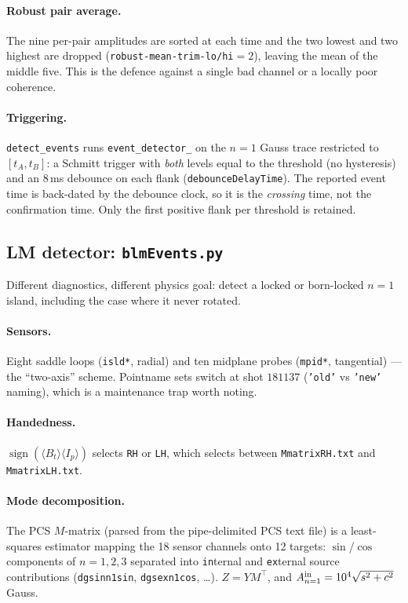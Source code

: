 \documentclass[11pt,a4paper]{article}
\newcommand{\code}[1]{\texttt{\small #1}}
\begin{document}
\paragraph{Robust pair average.} The nine per-pair amplitudes are sorted at each time and the two
lowest and two highest are dropped (\code{robust-mean-trim-lo/hi}$=2$), leaving the mean of the
middle five. This is the defence against a single bad channel or a locally poor coherence.

\paragraph{Triggering.} \code{detect\_events} runs \code{event\_detector\_} on the $n=1$ Gauss trace
restricted to $[t_A,t_B]$: a Schmitt trigger with \emph{both} levels equal to the threshold (no
hysteresis) and an $8$\,ms debounce on each flank (\code{debounceDelayTime}). The reported event
time is back-dated by the debounce clock, so it is the \emph{crossing} time, not the confirmation
time. Only the first positive flank per threshold is retained.

\subsection{LM detector: \code{blmEvents.py}}

Different diagnostics, different physics goal: detect a locked or born-locked $n=1$ island, including
the case where it never rotated.

\paragraph{Sensors.} Eight saddle loops (\code{isld*}, radial) and ten midplane probes
(\code{mpid*}, tangential) --- the ``two-axis'' scheme. Pointname sets switch at shot $181137$
(\code{'old'} vs \code{'new'} naming), which is a maintenance trap worth noting.

\paragraph{Handedness.} $\operatorname{sign}(\langle B_t\rangle\langle I_p\rangle)$ selects
\code{RH} or \code{LH}, which selects between \code{MmatrixRH.txt} and \code{MmatrixLH.txt}.

\paragraph{Mode decomposition.} The PCS $M$-matrix (parsed from the pipe-delimited PCS text file)
is a least-squares estimator mapping the 18 sensor channels onto 12 targets: $\sin$/$\cos$
components of $n=1,2,3$ separated into \code{in}ternal and \code{ex}ternal source contributions
(\code{dgsinn1sin}, \code{dgsexn1cos}, \dots). $Z = Y M^{\!\top}$, and
$A_{n=1}^{\rm in} = 10^4\sqrt{s^2+c^2}$ Gauss.
\end{document}
